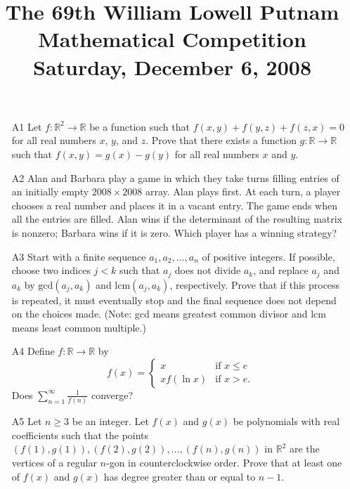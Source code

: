 \documentclass[amssymb,twocolumn,pra,10pt,aps]{revtex4-1}
\begin{document}
\title{The 69th William Lowell Putnam Mathematical Competition \\
    Saturday, December 6, 2008}
\maketitle

\begin{itemize}

\item[A1]
Let $f: \mathbb{R}^2 \to \mathbb{R}$ be a function such that $f(x,y) + f(y,z)
+ f(z,x) = 0$ for all real numbers $x$, $y$, and $z$. Prove that there exists
a function $g: \mathbb{R} \to \mathbb{R}$ such that $f(x,y) = g(x) - g(y)$
for all real numbers $x$ and $y$.

\item[A2]
Alan and Barbara play a game in which they take turns filling entries of
an initially empty $2008 \times 2008$ array. Alan plays first. At each
turn, a player chooses a real number and places it in a vacant entry.
The game ends when all the entries are filled. Alan wins if the
determinant of the resulting matrix is nonzero; Barbara wins if it is zero.
Which player has a winning strategy?

\item[A3]
Start with a finite sequence $a_1, a_2, \dots, a_n$ of positive integers.
If possible, choose two indices $j < k$ such that $a_j$ does not divide
$a_k$, and replace $a_j$ and $a_k$ by $\mathrm{gcd}(a_j, a_k)$
and $\mathrm{lcm}(a_j, a_k)$, respectively. Prove that if this process is
repeated, it must eventually stop and the final sequence does not depend
on the choices made. (Note: gcd means greatest common divisor and lcm
means least common multiple.)

\item[A4]
Define $f: \mathbb{R} \to \mathbb{R}$ by
\[
f(x) = \begin{cases} x & \mbox{if $x \leq e$} \\ x f(\ln x) &
\mbox{if $x > e$.} \end{cases}
\]
Does $\sum_{n=1}^\infty \frac{1}{f(n)}$ converge?

\item[A5]
Let $n \geq 3$ be an integer. Let $f(x)$ and $g(x)$ be polynomials
with real coefficients such that the points
$(f(1), g(1)), (f(2), g(2)), \dots, (f(n), g(n))$
in $\mathbb{R}^2$ are the vertices of a regular $n$-gon in
counterclockwise order. Prove that at least one of $f(x)$
and $g(x)$ has degree greater than or equal to $n-1$.


\end{itemize}
\end{document}
